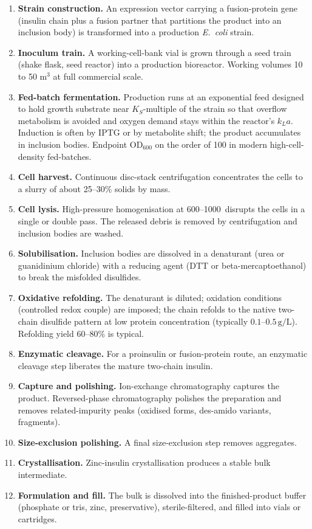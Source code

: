 \begin{enumerate}[leftmargin=*]
\item \textbf{Strain construction.} An expression vector carrying a
  fusion-protein gene (insulin chain plus a fusion partner that
  partitions the product into an inclusion body) is transformed into a
  production \emph{E.\ coli} strain.
\item \textbf{Inoculum train.} A working-cell-bank vial is grown
  through a seed train (shake flask, seed reactor) into a production
  bioreactor. Working volumes 10 to 50 m$^3$ at full commercial scale.
\item \textbf{Fed-batch fermentation.} Production runs at an
  exponential feed designed to hold growth substrate near
  $K_S$-multiple of the strain so that overflow metabolism is avoided
  and oxygen demand stays within the reactor's $k_L a$. Induction is
  often by IPTG or by metabolite shift; the product accumulates in
  inclusion bodies. Endpoint OD$_{600}$ on the order of 100 in modern
  high-cell-density fed-batches.
\item \textbf{Cell harvest.} Continuous disc-stack centrifugation
  concentrates the cells to a slurry of about 25--30\% solids by mass.
\item \textbf{Cell lysis.} High-pressure homogenisation at
  600--1000\, disrupts the cells in a single or double pass.
  The released debris is removed by centrifugation and inclusion bodies
  are washed.
\item \textbf{Solubilisation.} Inclusion bodies are dissolved in a
  denaturant (urea or guanidinium chloride) with a reducing agent
  (DTT or beta-mercaptoethanol) to break the misfolded disulfides.
\item \textbf{Oxidative refolding.} The denaturant is diluted; oxidation
  conditions (controlled redox couple) are imposed; the chain refolds
  to the native two-chain disulfide pattern at low protein
  concentration (typically $0.1$--$0.5\,\text{g}/\text{L}$). Refolding
  yield 60--80\% is typical.
\item \textbf{Enzymatic cleavage.} For a proinsulin or fusion-protein
  route, an enzymatic cleavage step liberates the mature two-chain
  insulin.
\item \textbf{Capture and polishing.} Ion-exchange chromatography
  captures the product. Reversed-phase chromatography polishes the
  preparation and removes related-impurity peaks (oxidised forms,
  des-amido variants, fragments).
\item \textbf{Size-exclusion polishing.} A final size-exclusion step
  removes aggregates.
\item \textbf{Crystallisation.} Zinc-insulin crystallisation produces a
  stable bulk intermediate.
\item \textbf{Formulation and fill.} The bulk is dissolved into the
  finished-product buffer (phosphate or tris, zinc, preservative),
  sterile-filtered, and filled into vials or cartridges.
\end{enumerate}

